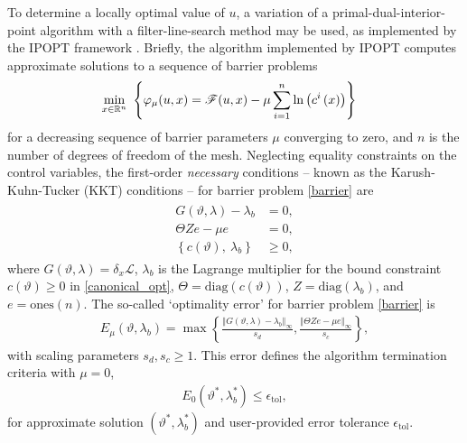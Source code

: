 To determine a locally optimal value of $u$, a variation of a primal-dual-interior-point algorithm with a filter-line-search method may be used, as implemented by the IPOPT framework \citep{waechter_2006}.  Briefly, the algorithm implemented by IPOPT computes approximate solutions to a sequence of barrier problems
\begin{align}
\begin{aligned}
  &\min_{x \in \mathbb{R}^n}\ \left\{ \varphi_{\mu}(u, x) = \mathscr{F}(u,x) - \mu \sum_{i=1}^n \ln \left( c^i\left( x \right) \right) \right\}
\end{aligned}
\label{barrier}
\end{align}
for a decreasing sequence of barrier parameters $\mu$ converging to zero, and $n$ is the number of degrees of freedom of the mesh.  Neglecting equality constraints on the control variables, the first-order  \emph{necessary} conditions -- known as the Karush-Kuhn-Tucker (KKT) conditions --  for barrier problem \cref{barrier} are
\begin{align}
\begin{aligned}
  G(\vartheta,\lambda) - \lambda_b &= 0, \\
  \varTheta Z e - \mu e &= 0, \\
  \left\{c(\vartheta),\ \lambda_b \right\} & \geq 0,
\end{aligned}
\label{barrier_kkt}
\end{align}
where $G(\vartheta,\lambda) = \delta_x \mathscr{L}$, $\lambda_b$ is the Lagrange multiplier for the bound constraint $c(\vartheta) \geq 0$ in \cref{canonical_opt}, $\varTheta = \mathrm{diag}(c(\vartheta))$, $Z = \mathrm{diag}(\lambda_b)$, and $e = \mathrm{ones}(n)$.  The so-called `optimality error' for barrier problem \cref{barrier} is
\begin{align*}
  E_{\mu}(\vartheta, \lambda_b) = \max
  \left\{
     \frac{\left\Vert G(\vartheta,\lambda) - \lambda_b \right\Vert_{\infty}}{s_d}, 
     \frac{\left\Vert \varTheta Z e - \mu e \right\Vert_{\infty}}{s_c}
  \right\},
\end{align*}
with scaling parameters $s_d,s_c \geq 1$.  This error defines the algorithm termination criteria with $\mu=0$,
\begin{align}
  \label{term_criteria}
  E_{0}(\vartheta^*, \lambda_b^*) \leq \epsilon_{\mathrm{tol}},
\end{align}
for approximate solution $(\vartheta^*, \lambda_b^*)$ and user-provided error tolerance $\epsilon_{\mathrm{tol}}$.

